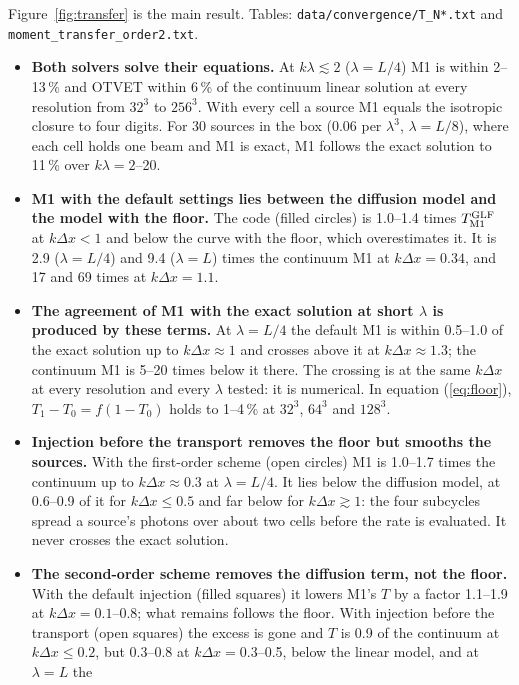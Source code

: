 \documentclass[11pt]{article}
\newcommand{\dx}{\Delta x}
\begin{document}
Figure~\ref{fig:transfer} is the main result. Tables: \texttt{data/convergence/T\_N*.txt} and
\texttt{moment\_transfer\_order2.txt}.

\begin{itemize}
\item \textbf{Both solvers solve their equations.} At $k\lambda\lesssim2$ ($\lambda=L/4$) M1 is within
2--13\,\% and OTVET within 6\,\% of the continuum linear solution at every resolution from $32^3$ to
$256^3$. With every cell a source M1 equals the isotropic closure to four digits. For 30 sources in the box ($0.06$ per $\lambda^3$, $\lambda=L/8$), where each
cell holds one beam and M1 is exact, M1 follows the exact solution to 11\,\% over $k\lambda=2$--20.
\item \textbf{M1 with the default settings lies between the diffusion model and the model with the floor.}
The code (filled circles) is 1.0--1.4 times $T^{\rm GLF}_{\rm M1}$ at $k\dx<1$ and below the curve with the
floor, which overestimates it. It is 2.9 ($\lambda=L/4$) and 9.4 ($\lambda=L$) times the continuum M1 at $k\dx=0.34$, and 17 and 69 times at
$k\dx=1.1$.
\item \textbf{The agreement of M1 with the exact solution at short $\lambda$ is produced by these terms.} At
$\lambda=L/4$ the default M1 is within 0.5--1.0 of the exact solution up to $k\dx\approx1$ and crosses above
it at $k\dx\approx1.3$; the continuum M1 is 5--20 times below it there. The crossing is at the same
$k\dx$ at every resolution and every $\lambda$ tested: it is numerical. In equation
(\ref{eq:floor}), $T_1-T_0=f(1-T_0)$ holds to 1--4\,\% at $32^3$, $64^3$ and $128^3$.
\item \textbf{Injection before the transport removes the floor but smooths the sources.} With the first-order scheme
(open circles) M1 is 1.0--1.7 times the continuum up to $k\dx\approx0.3$ at $\lambda=L/4$. It lies below the
diffusion model, at 0.6--0.9 of it for $k\dx\le0.5$ and far below for $k\dx\gtrsim1$: the four subcycles spread a source's photons over about two cells before
the rate is evaluated. It never crosses the exact solution.
\item \textbf{The second-order scheme removes the diffusion term, not the floor.} With the default
injection (filled squares) it lowers M1's $T$ by a factor 1.1--1.9 at $k\dx=0.1$--0.8; what remains follows
the floor. With injection before the transport (open squares) the excess is gone and $T$ is 0.9 of the
continuum at $k\dx\le0.2$, but 0.3--0.8 at $k\dx=0.3$--0.5, below the linear model, and at $\lambda=L$ the

\end{itemize}
\end{document}
